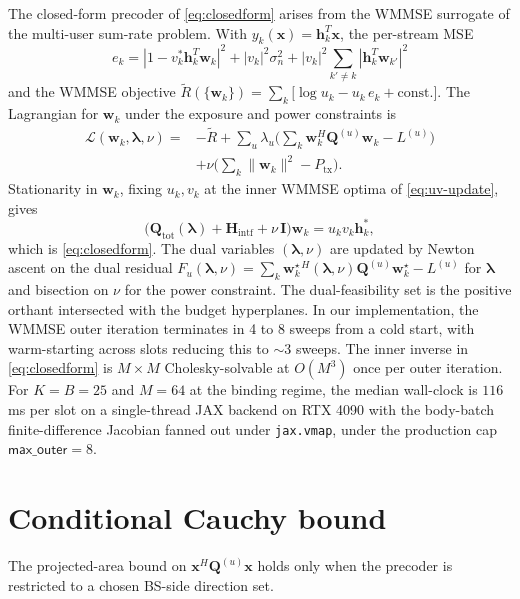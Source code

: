 \documentclass[journal,twocolumn,10pt]{IEEEtran}
\theoremstyle{plain}
\theoremstyle{remark}
\newcommand{\xx}{\mathbf{x}}
\newcommand{\hh}{\mathbf{h}}
\newcommand{\ww}{\mathbf{w}}
\newcommand{\Qmat}{\mathbf{Q}}
\newcommand{\Hintf}{\mathbf{H}_{\mathrm{intf}}}
\begin{document}
The closed-form precoder of \cref{eq:closedform} arises from the
WMMSE surrogate of the multi-user sum-rate problem. With
$y_k(\xx) = \hh_k^T \xx$, the per-stream MSE
\begin{equation}
  e_k = |1 - v_k^* \hh_k^T \ww_k|^2 + |v_k|^2 \sigma_n^2 +
  |v_k|^2 \sum_{k' \neq k} |\hh_k^T \ww_{k'}|^2
\end{equation}
and the WMMSE objective
$\tilde R(\{\ww_k\}) = \sum_k\bigl[\log u_k - u_k\,e_k +
\mathrm{const.}\bigr]$. The Lagrangian for $\ww_k$ under the
exposure and power constraints is
\begin{equation}\label{eq:lagrangian}
\begin{aligned}
\mathcal{L}({\ww_k}, \bm\lambda, \nu)
={}& -\tilde R + \sum_u \lambda_u
  \biggl(\sum_k \ww_k^H \Qmat^{(u)} \ww_k - L^{(u)}\biggr) \\
& + \nu\biggl(\sum_k \|\ww_k\|^2 - P_{\mathrm{tx}}\biggr).
\end{aligned}
\end{equation}
Stationarity in $\ww_k$, fixing $u_k, v_k$ at the inner WMMSE
optima of \cref{eq:uv-update}, gives
\begin{equation}\label{eq:KKT}
  \bigl(\Qmat_{\mathrm{tot}}(\bm\lambda) + \Hintf + \nu\,
  \mathbf{I}\bigr) \ww_k = u_k v_k \hh_k^*,
\end{equation}
which is \cref{eq:closedform}. The dual variables
$(\bm\lambda, \nu)$ are updated by Newton ascent on the dual
residual
$F_u(\bm\lambda, \nu) = \sum_k \ww_k^{\star\,H}(\bm\lambda, \nu)
\Qmat^{(u)} \ww_k^\star - L^{(u)}$ for $\bm\lambda$ and bisection
on $\nu$ for the power constraint. The dual-feasibility set is the
positive orthant intersected with the budget hyperplanes. In our
implementation, the WMMSE outer iteration terminates in 4 to 8
sweeps from a cold start, with warm-starting across slots reducing
this to $\sim 3$ sweeps. The inner inverse in
\cref{eq:closedform} is $M \times M$ Cholesky-solvable at $O(M^3)$
once per outer iteration. For $K = B = 25$ and $M = 64$ at the
binding regime, the median wall-clock is $116\,$ms per slot on a
single-thread JAX backend on RTX 4090 with the body-batch
finite-difference Jacobian fanned out under \texttt{jax.vmap},
under the production cap $\textsf{max\_outer} = 8$.


\section{Conditional Cauchy bound}\label{app:cauchy}

The projected-area bound on $\xx^H \Qmat^{(u)} \xx$ holds only
when the precoder is restricted to a chosen BS-side direction set.
\end{document}
